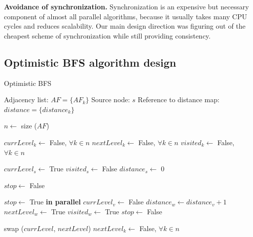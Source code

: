 \documentclass[letterpaper]{article}
\begin{document}
			\textbf{Avoidance of synchronization.}
			Synchronization is an expensive but necessary component of almost all parallel algorithms, because it usually takes many CPU cycles and reduces scalability.
			Our main design direction was figuring out of the cheapest scheme of synchronization while still providing consistency.
			
			
		\subsection{Optimistic BFS algorithm design}
		
			\begin{algorithm}[h]
				\caption{Optimistic BFS}
				\label{alg:optbfs}
				\begin{algorithmic}[1]
					\Require
						\Statex Adjacency list: $AF = \lbrace AF_k \rbrace$
						\Statex Source node: $s$
						\Statex Reference to distance map: $distance = \lbrace distance_k \rbrace$
					\Statex

					\State $n \gets$ size ($AF$) 					
					
					\State $currLevel_k \gets$ False, $\forall k \in n$
					\State $nextLevel_k \gets$ False, $\forall k \in n$
					\State $visited_k \gets$ False, $\forall k \in n$
					\Statex
					
					\State $currLevel_s \gets$ True
					\State $visited_s \gets$ False
					\State $distance_s \gets$ 0
					\Statex
					
					\State $stop \gets$ False
					\Statex
					
						\State $stop\gets$ True
						 \textbf{in parallel}
								\State $currLevel_v \gets$ False
										\State $distance_w \gets distance_v + 1$
										\State $nextLevel_w \gets$ True
										\State $visited_w \gets$ True
										\State $stop \gets$ False
									\EndIf
								\EndFor
							\EndIf
						\EndFor
						
						\vspace{-0.051cm} %
						
						\State swap ($currLevel$, $nextLevel$)
						\State $nextLevel_k \gets$ False, $\forall k\in n$
					\EndWhile
				\end{algorithmic}
			\end{algorithm}

		
		
\end{document}
